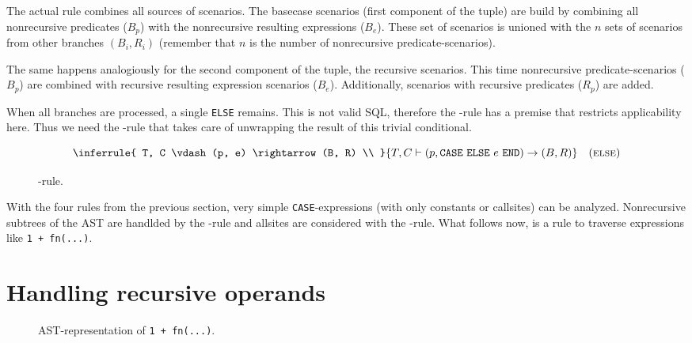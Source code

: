 The actual rule combines all sources of scenarios. The basecase scenarios (first component of the tuple) are build by combining all nonrecursive predicates ($B_p$) with the nonrecursive resulting expressions ($B_e$). These set of scenarios is unioned with the $n$ sets of scenarios from other branches $(B_i, R_i)$ (remember that $n$ is the number of nonrecursive predicate-scenarios).

The same happens analogiously for the second component of the tuple, the recursive scenarios. This time nonrecursive predicate-scenarios ($B_p$) are combined with recursive resulting expression scenarios ($B_e$). Additionally, scenarios with recursive predicates ($R_p$) are added.

When all branches are processed, a single \texttt{ELSE} remains. This is not valid SQL, therefore the \RBASE-rule has a premise that restricts applicability here. Thus we need the \RELSE-rule that takes care of unwrapping the result of this trivial conditional.
\begin{figure}[h!]
    \centering\small
$$\inferrule{
    T, C \vdash (p, e) \rightarrow (B, R) \\
}{
    T, C \vdash (p, \CASE ~\ELSE ~e~ \END) \rightarrow (B, R)
}
\quad(\textsc{else})$$
    \caption{\RELSE-rule.}
    \label{fig:my_label}
\end{figure}

With the four rules from the previous section, very simple \texttt{CASE}-expressions (with only constants or callsites) can be analyzed. Nonrecursive subtrees of the AST are handlded by the \RBASE-rule and allsites are considered with the \RREC-rule. What follows now, is a rule to traverse expressions like \texttt{1 + fn(...)}.

\section{Handling recursive operands}

\begin{wrapfigure}{r}{.3\textwidth}
  \centering
  \caption{AST-representation of \texttt{1 + fn(...)}.}
  \label{ast:expr}
\end{wrapfigure}

